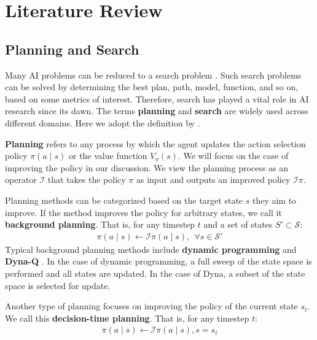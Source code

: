 \chapter{Literature Review} \label{sec:literature}

\section{Planning and Search}
Many AI problems can be reduced to a search problem \cite[p.39]{ArtificialIntelligenceGames_Yannakakis.Togelius_2018}.
Such search problems can be solved by determining the best plan, path, model, function, and so on, based on some metrics of interest.
Therefore, search has played a vital role in AI research since its dawn. The terms \textbf{planning} and \textbf{search} are widely used across different domains.
Here we adopt the definition by \citeauthor{ReinforcementLearningIntroduction_Sutton.Barto_2018} \cite{ReinforcementLearningIntroduction_Sutton.Barto_2018}.

\textbf{Planning} refers to any process by which the agent updates the action selection policy $\pi(a \mid s)$ or the value function $V_\pi(s)$.
We will focus on the case of improving the policy in our discussion.
We view the planning process as an operator $\mathcal{I}$ that takes the policy \(\pi\) as input and outputs an improved policy $\mathcal{I}\pi$.

Planning methods can be categorized based on the target state $s$ they aim to improve.
If the method improves the policy for arbitrary states, we call it \textbf{background planning}.
That is, for any timestep $t$ and a set of states $S' \subset \mathcal{S}$:
\begin{align*}
    \pi(a \mid s) \leftarrow \mathcal{I}\pi(a \mid s), ~~ \forall s \in \mathcal{S'}
\end{align*}
Typical background planning methods include \textbf{dynamic programming} and \textbf{Dyna-Q} \cite{ReinforcementLearningIntroduction_Sutton.Barto_2018}.
In the case of dynamic programming, a full sweep of the state space is performed and all states are updated.
In the case of Dyna, a subset of the state space is selected for update.

Another type of planning focuses on improving the policy of the current state $s_t$.
We call this \textbf{decision-time planning}.
That is, for any timestep $t$:
\begin{align*}
    \pi(a \mid s) \leftarrow \mathcal{I}\pi(a \mid s), s = s_t
\end{align*}

